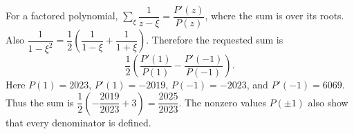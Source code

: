 For a factored polynomial, $\sum_\xi\dfrac{1}{z-\xi}=\dfrac{P'(z)}{P(z)}$, where the sum is over its roots. Also $\dfrac{1}{1-\xi^2}=\dfrac{1}{2}(\dfrac{1}{1-\xi}+\dfrac{1}{1+\xi})$. Therefore the requested sum is
\[\dfrac{1}{2}\left(\dfrac{P'(1)}{P(1)}-\dfrac{P'(-1)}{P(-1)}\right).\]
Here $P(1)=2023$, $P'(1)=-2019$, $P(-1)=-2023$, and $P'(-1)=6069$. Thus the sum is $\dfrac{1}{2}(-\dfrac{2019}{2023}+3)=\boxed{\dfrac{2025}{2023}}$. The nonzero values $P(\pm1)$ also show that every denominator is defined.
